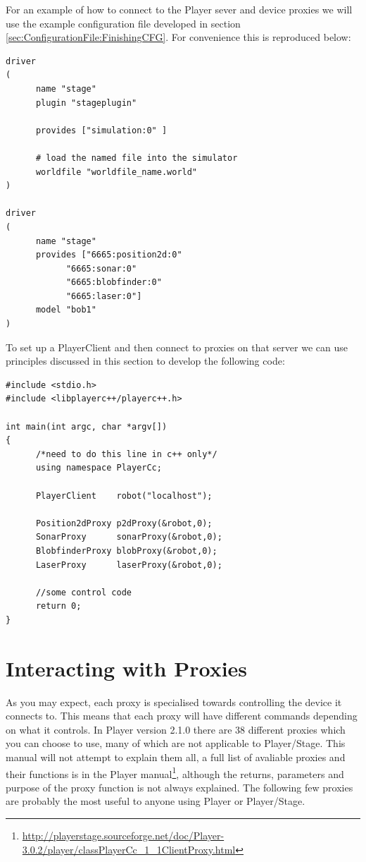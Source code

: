 \documentclass[a4paper]{report}
\newcommand{\plst}{Player/Stage\xspace}
\newcommand{\pl}{Player\xspace}
\begin{document}
For an example of how to connect to the \pl sever and device proxies we will use the example configuration file developed in section \ref{sec:ConfigurationFile:FinishingCFG}. For convenience this is reproduced below:
\begin{verbatim}
driver
(		
      name "stage"
      plugin "stageplugin"

      provides ["simulation:0" ]

      # load the named file into the simulator
      worldfile "worldfile_name.world"	
)      

driver
(
      name "stage"
      provides ["6665:position2d:0" 
            "6665:sonar:0" 
            "6665:blobfinder:0" 
            "6665:laser:0"]
      model "bob1" 
)
\end{verbatim}
To set up a PlayerClient and then connect to proxies on that server we can use principles discussed in this section to develop the following code:
\begin{verbatim}
#include <stdio.h>
#include <libplayerc++/playerc++.h>

int main(int argc, char *argv[])
{
      /*need to do this line in c++ only*/
      using namespace PlayerCc;
	
      PlayerClient    robot("localhost");

      Position2dProxy p2dProxy(&robot,0);
      SonarProxy      sonarProxy(&robot,0);
      BlobfinderProxy blobProxy(&robot,0);
      LaserProxy      laserProxy(&robot,0);

      //some control code
      return 0;
}
\end{verbatim}

\section{Interacting with Proxies}\label{sec:Coding:InteractingWithProxies}

As you may expect, each proxy is specialised towards controlling the device it connects to. This means that each proxy will have different commands depending on what it controls. 
In Player version 2.1.0 there are 38 different proxies which you can choose to use, many of which are not applicable to \plst. This manual will not attempt to explain them all, a full list of avaliable proxies and their functions is in the \pl manual\footnote{\url{http://playerstage.sourceforge.net/doc/Player-3.0.2/player/classPlayerCc\_1\_1ClientProxy.html}}, although the returns, parameters and purpose of the proxy function is not always explained. 
\newline The following few proxies are probably the most useful to anyone using \pl or \plst.
\end{document}
